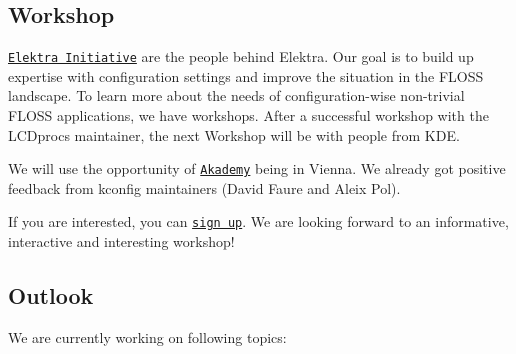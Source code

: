 \subsection*{Workshop}

\href{https://www.libelektra.org/developers/authors}{\tt Elektra Initiative} are the people behind Elektra. Our goal is to build up expertise with configuration settings and improve the situation in the F\+L\+O\+SS landscape. To learn more about the needs of configuration-\/wise non-\/trivial F\+L\+O\+SS applications, we have workshops. After a successful workshop with the L\+C\+Dproc\textquotesingle{}s maintainer, the next Workshop will be with people from K\+DE.

We will use the opportunity of \href{https://akademy.kde.org/2018}{\tt Akademy} being in Vienna. We already got positive feedback from kconfig maintainers (David Faure and Aleix Pol).

If you are interested, you can \href{https://dudle.inf.tu-dresden.de/config_workshop_akademy/}{\tt sign up}. We are looking forward to an informative, interactive and interesting workshop!

\subsection*{Outlook}

We are currently working on following topics\+:


